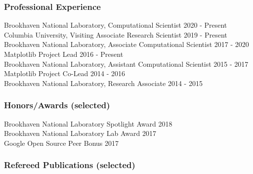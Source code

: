 \documentclass[12pt]{article}
\numberwithin{page}{section}
\begin{document}
\subsubsection*{Professional Experience}
Brookhaven National Laboratory, Computational Scientist \hfill 2020 - Present\\
Columbia University, Visiting Associate Research Scientist \hfill 2019 - Present \\
Brookhaven National Laboratory, Associate Computational Scientist \hfill 2017 - 2020\\
Matplotlib Project Lead \hfill 2016 - Present\\
Brookhaven National Laboratory, Assistant Computational Scientist \hfill 2015 - 2017\\
Matplotlib Project Co-Lead \hfill 2014 - 2016\\
Brookhaven National Laboratory, Research Associate \hfill 2014 - 2015\\

\subsubsection*{Honors/Awards (selected)}
Brookhaven National Laboratory Spotlight  Award \hfill 2018\\
Brookhaven National Laboratory Lab Award \hfill 2017\\
Google Open Source Peer Bonus \hfill 2017

\subsubsection*{Refereed Publications (selected)}
\end{document}
